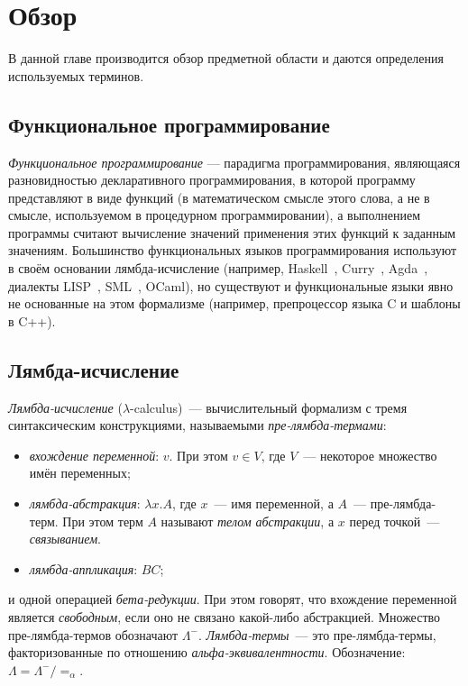 \chapter{Обзор
}
\label{chapter1}

В данной главе производится обзор предметной области и даются определения используемых терминов.

\section{Функциональное программирование}

\emph{Функциональное программирование} — парадигма программирования,
являющаяся разновидностью декларативного программирования,
в которой программу представляют в виде функций
(в математическом смысле этого слова, а не в смысле, используемом в процедурном программировании),
а выполнением программы считают вычисление значений применения этих функций к заданным значениям.
Большинство функциональных языков программирования используют в своём основании лямбда-исчисление
(например, Haskell~\cite{HaskellLang}, Curry~\cite{CurryLang}, Agda~\cite{AgdaLang},
диалекты LISP~\cite{SchemeLang,ClojureLang,SICP}, SML~\cite{SMLLang}, OCaml\cite{OCamlLang}),
но существуют и функциональные языки явно не основанные на этом формализме
(например, препроцессор языка C и шаблоны в C++).

\section{Лямбда-исчисление}

\emph{Лямбда-исчисление} ($\lambda$-calculus)~— вычислительный формализм
с тремя синтаксическим конструкциями, называемыми \emph{пре-лямбда-термами}:
\begin{itemize}
\item \emph{вхождение переменной}: $v$. При этом $v \in V$, где $V$~— некоторое множество имён переменных;
\item \emph{лямбда-абстракция}: $\lambda x.A$, где $x$~— имя переменной, а $A$~— пре-лямбда-терм. При этом терм $A$ называют \emph{телом абстракции}, а $x$ перед точкой~— \emph{связыванием}.
\item \emph{лямбда-аппликация}: $B C$;
\end{itemize}
и одной операцией \emph{бета-редукции}.
При этом говорят, что вхождение переменной является \emph{свободным},
если оно не связано какой-либо абстракцией.
Множество пре-лямбда-термов обозначают $\Lambda^{-}$.
\emph{Лямбда-термы}~— это пре-лямбда-термы, факторизованные по отношению \emph{альфа-эквивалентности}.
Обозначение: $\Lambda = \Lambda^{-} / =_{\alpha} $.

